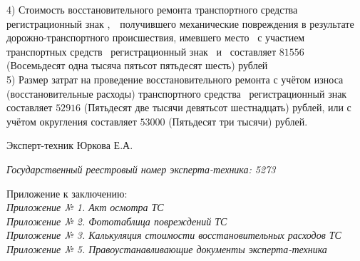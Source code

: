 4)  Стоимость восстановительного ремонта  транспортного средства \tc\, регистрационный знак ,\, \, получившего механические повреждения в результате дорожно-транспортного происшествия, имевшего место \, с участием транспортных средств \, регистрационный знак \, и \tca\, составляет $81 556$ (Восемьдесят одна тысяча пятьсот пятьдесят шесть) рублей\\[3mm]
    
5) Размер затрат на проведение восстановительного ремонта с учётом износа (восстановительные расходы) транспортного средства \tc\, регистрационный знак \grz\, составляет  $ 52 916 $ (Пятьдесят две тысячи девятьсот шестнадцать) рублей, или с учётом округления составляет $ 53 000 $ (Пятьдесят три тысячи) рублей.\\[3mm]
    
    
    
    
\vspace{10mm}

 \noindent Эксперт-техник   \hfill        Юркова Е.А.
 
\vspace{1mm}
\noindent   \textit{  Государственный  реестровый номер эксперта-техника:   5273}\\

\vspace{15mm}

\relax
\noindent Приложение к заключению:\\
\textit{
    Приложение № 1. Акт осмотра ТС \\
    Приложение № 2. Фототаблица повреждений ТС\\
	Приложение № 3. Калькуляция стоимости восстановительных расходов ТС \\
	Приложение № 5. Правоустанавливающие документы эксперта-техника\\
}

%
%
